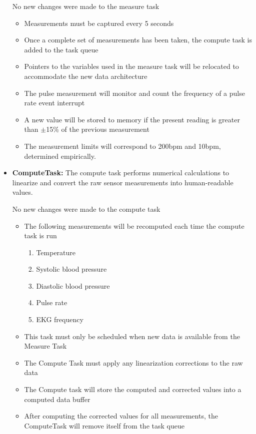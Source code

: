 \documentclass[12pt]{article} %
\begin{document}
\begin{itemize}
		No new changes were made to the measure task
    \begin{itemize}
			\item Measurements must be captured every 5 seconds
      \item Once a complete set of measurements has been taken, the compute
	task is added to the task queue
      \item Pointers to the variables used in the measure task will be
	relocated to accommodate the new data architecture
      \item The pulse measurement will monitor and count the frequency of a
	pulse rate event interrupt
      \item A new value will be stored to memory if the present reading is
	greater than $\pm$15\% of the previous measurement
      \item The measurement limits will correspond to 200bpm and 10bpm,
	determined empirically. 
    \end{itemize}

	\item \textbf{ComputeTask:}
		The compute task performs numerical calculations to linearize and convert
		the raw sensor measurements into human-readable values.
		
		No new changes were made to the compute task
    \begin{itemize}
      \item The following measurements will be recomputed each time the compute task is run
				\begin{enumerate}
					\item Temperature
					\item Systolic blood pressure
					\item Diastolic blood pressure
					\item Pulse rate
					\item EKG frequency
				\end{enumerate}
			\item This task must only be scheduled when new data is available from
				the Measure Task
			\item The Compute Task must apply any linearization corrections to the
				raw data
			\item The Compute task will store the computed and corrected values into
				a computed data buffer
			\item After computing the corrected values for all measurements, the
	ComputeTask will remove itself from the task queue
    \end{itemize}


\end{itemize}
\end{document}
